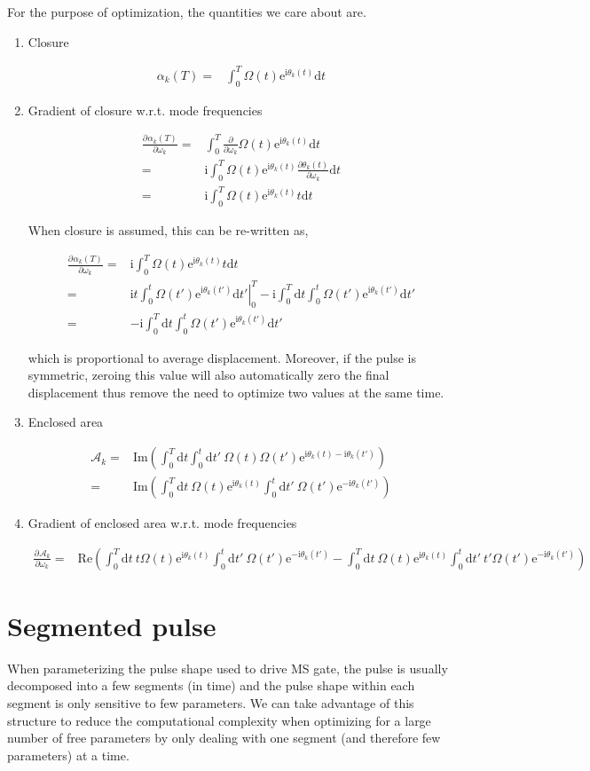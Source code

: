 \documentclass[10pt,fleqn]{article}
\newcommand{\ud}{\mathrm{d}}
\newcommand{\ue}{\mathrm{e}}
\newcommand{\ui}{\mathrm{i}}
\newcommand{\eqar}[1]
{
  \begin{align*}
    #1
  \end{align*}
}
\newcommand{\paren}[1]{{\left({#1}\right)}}
\newcommand{\pdiff}[3][{}]{{\frac{\partial^{#1} {#2}}{\partial {#3}{}^{#1}}}}
\begin{document}
For the purpose of optimization, the quantities we care about are.
\begin{enumerate}
\item Closure
  \eqar{
    \alpha_k(T)=&\int_0^T\Omega(t)\ue^{\ui\theta_k(t)}\ud t
  }
\item Gradient of closure w.r.t. mode frequencies
  \eqar{
    \pdiff{\alpha_k(T)}{\omega_k}=&\int_0^T\frac{\partial}{\partial\omega_k}\Omega(t)\ue^{\ui\theta_k(t)}\ud t\\
    =&\ui\int_0^T\Omega(t)\ue^{\ui\theta_k(t)}\frac{\partial\theta_k(t)}{\partial\omega_k}\ud t\\
    =&\ui\int_0^T\Omega(t)\ue^{\ui\theta_k(t)}t\ud t
  }
  When closure is assumed, this can be re-written as,
  \eqar{
    \pdiff{\alpha_k(T)}{\omega_k}=&\ui\int_0^T\Omega(t)\ue^{\ui\theta_k(t)}t\ud t\\
    =&\ui\left.t\int_0^t\Omega(t')\ue^{\ui\theta_k(t')}\ud t'\right|_0^T-\ui\int_0^T\ud t\int_0^t\Omega(t')\ue^{\ui\theta_k(t')}\ud t'\\
    =&-\ui\int_0^T\ud t\int_0^t\Omega(t')\ue^{\ui\theta_k(t')}\ud t'
  }
  which is proportional to average displacement.
  Moreover, if the pulse is symmetric, zeroing this value will also automatically
  zero the final displacement thus remove the need to optimize
  two values at the same time.
\item Enclosed area
  \eqar{
    \mathcal{A}_k=&\mathrm{Im}\paren{\int_0^T\!\!\ud t\int_0^t\!\!\ud t'
      \ \Omega(t)\Omega(t')\ue^{\ui\theta_k(t)-\ui\theta_k(t')}}\\
    =&\mathrm{Im}\paren{\int_0^T\!\!\ud t\ \Omega(t)\ue^{\ui\theta_k(t)}\int_0^t\!\!\ud t'
      \ \Omega(t')\ue^{-\ui\theta_k(t')}}
  }
\item Gradient of enclosed area w.r.t. mode frequencies
  \eqar{
    \pdiff{\mathcal{A}_k}{\omega_k}
    =&\mathrm{Re}\paren{\int_0^T\!\!\ud t\ t\Omega(t)\ue^{\ui\theta_k(t)}\int_0^t\!\!\ud t'
      \ \Omega(t')\ue^{-\ui\theta_k(t')}-\int_0^T\!\!\ud t\ \Omega(t)\ue^{\ui\theta_k(t)}\int_0^t\!\!\ud t'
      \ t'\Omega(t')\ue^{-\ui\theta_k(t')}}
  }
\end{enumerate}

\section{Segmented pulse}
When parameterizing the pulse shape used to drive MS gate,
the pulse is usually decomposed into a few segments (in time)
and the pulse shape within each segment is only sensitive to
few parameters. We can take advantage of this structure
to reduce the computational complexity when optimizing for
a large number of free parameters by only dealing with one segment
(and therefore few parameters) at a time.\\
\end{document}
